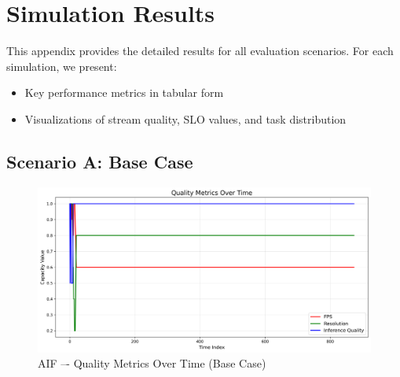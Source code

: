 \appendix
\chapter{Simulation Results}

This appendix provides the detailed results for all evaluation scenarios. For each simulation, we present:
\begin{itemize}
    \item Key performance metrics in tabular form
    \item Visualizations of stream quality, SLO values, and task distribution
\end{itemize}


\section{Scenario A: Base Case}




\begin{figure}[h]
    \centering
    \includegraphics[width=\textwidth]{img/results/basic/active_inference_relative_control_quality_metrics.png}
    \caption{AIF –- Quality Metrics Over Time (Base Case)}
\end{figure}

